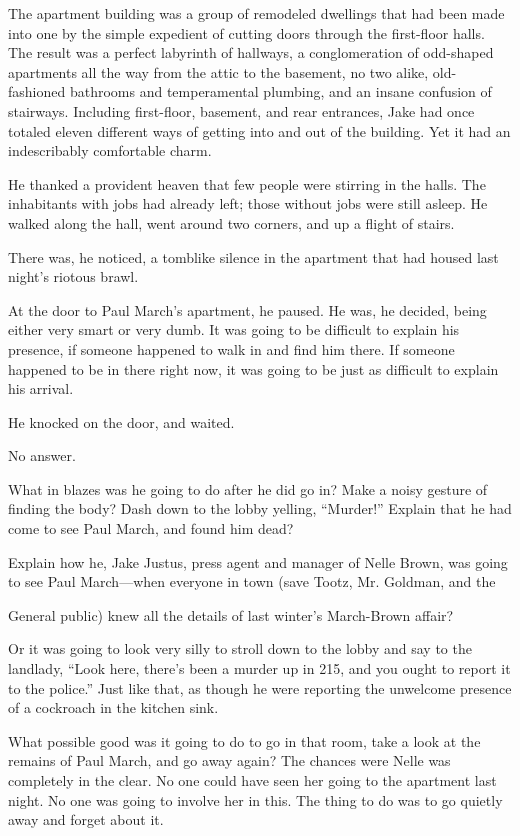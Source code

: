 \documentclass{novel}
\begin{document}
The apartment building was a group of remodeled dwellings that had been made into one by the simple expedient of cutting doors through the first-floor halls. The result was a perfect labyrinth of hallways, a conglomeration of odd-shaped apartments all the way from the attic to the basement, no two alike, old-fashioned bathrooms and temperamental plumbing, and an insane confusion of stairways. Including first-floor, basement, and rear entrances, Jake had once totaled eleven different ways of getting into and out of the building. Yet it had an indescribably comfortable charm.

He thanked a provident heaven that few people were stirring in the halls. The inhabitants with jobs had already left; those without jobs were still asleep. He walked along the hall, went around two corners, and up a flight of stairs.

There was, he noticed, a tomblike silence in the apartment that had housed last night’s riotous brawl.

At the door to Paul March’s apartment, he paused. He was, he decided, being either very smart or very dumb. It was going to be difficult to explain his presence, if someone happened to walk in and find him there. If someone happened to be in there right now, it was going to be just as difficult to explain his arrival.

He knocked on the door, and waited.

No answer.

What in blazes was he going to do after he did go in? Make a noisy gesture of finding the body? Dash down to the lobby yelling, “Murder!” Explain that he had come to see Paul March, and found him dead?

Explain how he, Jake Justus, press agent and manager of Nelle Brown, was going to see Paul March—when everyone in town (save Tootz, Mr. Goldman, and the

General public) knew all the details of last winter’s March-Brown affair?

Or it was going to look very silly to stroll down to the lobby and say to the landlady, “Look here, there’s been a murder up in 215, and you ought to report it to the police.” Just like that, as though he were reporting the unwelcome presence of a cockroach in the kitchen sink.

What possible good was it going to do to go in that room, take a look at the remains of Paul March, and go away again? The chances were Nelle was completely in the clear. No one could have seen her going to the apartment last night. No one was going to involve her in this. The thing to do was to go quietly away and forget about it.
\end{document}
